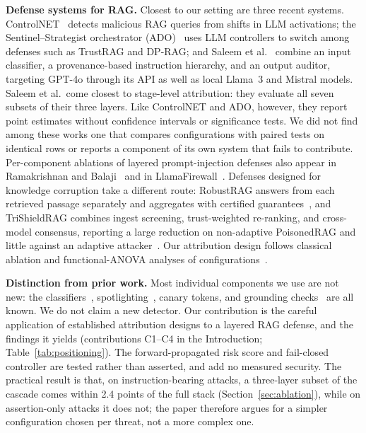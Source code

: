 \documentclass[conference]{IEEEtran}
\begin{document}
\textbf{Defense systems for RAG.} Closest to our setting are three recent systems. ControlNET~\cite{yao2025controlnet} detects malicious RAG queries from shifts in LLM activations; the Sentinel--Strategist orchestrator (ADO)~\cite{palleria2026ado} uses LLM controllers to switch among defenses such as TrustRAG and DP-RAG; and Saleem et al.~\cite{saleem2026layered} combine an input classifier, a provenance-based instruction hierarchy, and an output auditor, targeting GPT-4o through its API as well as local Llama~3 and Mistral models. Saleem et al.\ come closest to stage-level attribution: they evaluate all seven subsets of their three layers. Like ControlNET and ADO, however, they report point estimates without confidence intervals or significance tests. We did not find among these works one that compares configurations with paired tests on identical rows or reports a component of its own system that fails to contribute. Per-component ablations of layered prompt-injection defenses also appear in Ramakrishnan and Balaji~\cite{ramakrishnan2025securing} and in LlamaFirewall~\cite{chennabasappa2025llamafirewall}. Defenses designed for knowledge corruption take a different route: RobustRAG answers from each retrieved passage separately and aggregates with certified guarantees~\cite{xiang2024robustrag}, and TriShieldRAG combines ingest screening, trust-weighted re-ranking, and cross-model consensus, reporting a large reduction on non-adaptive PoisonedRAG and little against an adaptive attacker~\cite{trishield2026}. Our attribution design follows classical ablation and functional-ANOVA analyses of configurations~\cite{fawcett2016ablation,hutter2014fanova}.

\textbf{Distinction from prior work.} Most individual components we use are not new: the classifiers~\cite{protectai2024,inan2023llamaguard}, spotlighting~\cite{hines2024spotlighting}, canary tokens, and grounding checks~\cite{es2023ragas} are all known. We do not claim a new detector. Our contribution is the careful application of established attribution designs to a layered RAG defense, and the findings it yields (contributions C1--C4 in the Introduction; Table~\ref{tab:positioning}). The forward-propagated risk score and fail-closed controller are tested rather than asserted, and add no measured security. The practical result is that, on instruction-bearing attacks, a three-layer subset of the cascade comes within 2.4 points of the full stack (Section~\ref{sec:ablation}), while on assertion-only attacks it does not; the paper therefore argues for a simpler configuration chosen per threat, not a more complex one.
\end{document}
